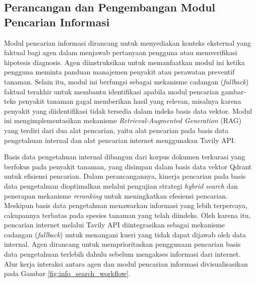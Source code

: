 \subsection{Perancangan dan Pengembangan Modul Pencarian Informasi}
Modul pencarian informasi dirancang untuk menyediakan konteks eksternal yang faktual bagi agen dalam menjawab pertanyaan pengguna atau memverifikasi hipotesis diagnosis. Agen diinstruksikan untuk memanfaatkan modul ini ketika pengguna meminta panduan manajemen penyakit atau perawatan preventif tanaman. Selain itu, modul ini berfungsi sebagai mekanisme cadangan (\textit{fallback}) faktual terakhir untuk membantu identifikasi apabila modul pencarian gambar-teks penyakit tanaman gagal memberikan hasil yang relevan, misalnya karena penyakit yang diidentifikasi tidak tersedia dalam indeks basis data vektor. Modul ini mengimplementasikan mekanisme \textit{Retrieval-Augmented Generation} (RAG) yang terdiri dari dua alat pencarian, yaitu alat pencarian pada basis data pengetahuan internal dan alat pencarian internet menggunakan Tavily API.

Basis data pengetahuan internal dibangun dari korpus dokumen terkurasi yang berfokus pada penyakit tanaman, yang disimpan dalam basis data vektor Qdrant untuk efisiensi pencarian. Dalam perancangannya, kinerja pencarian pada basis data pengetahuan dioptimalkan melalui pengujian strategi \textit{hybrid search} dan penerapan mekanisme \textit{reranking} untuk meningkatkan efesiensi pencarian. Meskipun basis data pengetahuan menawarkan informasi yang lebih terpercaya, cakupannya terbatas pada spesies tanaman yang telah diindeks. Oleh karena itu, pencarian internet melalui Tavily API diintegrasikan sebagai mekanisme cadangan (\textit{fallback}) untuk menangani kueri yang tidak dapat dijawab oleh data internal. Agen dirancang untuk memprioritaskan penggunaan pencarian basis data pengetahuan terlebih dahulu sebelum mengakses informasi dari internet. Alur kerja interaksi antara agen dan modul pencarian informasi divisualisasikan pada Gambar \ref{fig:info_search_workflow}.

